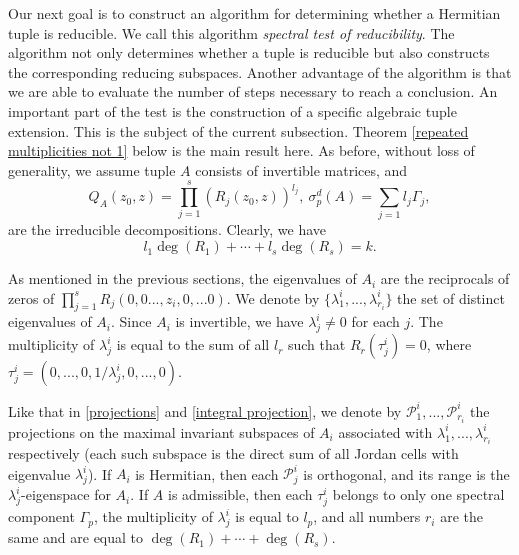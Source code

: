\documentclass[draft, 12pt, reqno]{amsart}
\numberwithin{equation}{section}
\theoremstyle{plain}
\begin{document}
Our next goal is to construct an algorithm  for determining  whether a Hermitian tuple is reducible. We call this algorithm \textit{spectral test of reducibility}. The algorithm not only determines whether a tuple is reducible but also constructs the corresponding reducing subspaces.  Another advantage of the algorithm is that we are able to evaluate the number of steps necessary to reach a conclusion. An important part of the test is the construction of a specific algebraic tuple extension. This is the subject of the current subsection. Theorem \ref{repeated multiplicities not 1} below is the main result here.
As before, without loss of generality, we assume tuple $A$ consists of invertible matrices, and
\begin{equation}\label{spectrum2}
Q_A(z_0,z)=\displaystyle \prod_{j=1}^s (R_j(z_0,z))^{l_j}, \ \sigma_p^d(A)=\sum_{j=1}l_j\Gamma_j, 
\end{equation}
are the irreducible decompositions. Clearly, we have
 \begin{equation}\label{components 0}
l_1  \deg(R_1)+\cdots +l_s  \deg(R_s)= k.
\end{equation}

As mentioned in the previous sections, the eigenvalues of $A_i$ are the reciprocals of zeros of $\prod_{j=1}^s R_j(0,0...,z_i,0,...0)$. We denote by $\{\lambda_1^i,...,\lambda_{r_i}^i\}$ the set of distinct eigenvalues of $A_i$. Since $A_i$ is invertible, we have $\lambda_j^i\neq 0$ for each $j$. The multiplicity of $\lambda_j^i$ is equal to the sum of all $l_r$ such that $R_r(\tau_j^i)=0$, where $\tau_j^i=(0,...,0,1/\lambda_j^i,0,...,0)$. 

Like that in \eqref{projections} and \eqref{integral projection}, we denote by $\mathcal{P}_1^i,...,\mathcal{P}_{r_i}^i$ the  projections on the maximal invariant subspaces of $A_i$ associated with  $\lambda_1^i,...,\lambda_{r_i}^i$ respectively (each such subspace is the direct sum of all Jordan cells with eigenvalue $\lambda_j^i$). If $A_i$ is Hermitian, then each $\mathcal{P}_j^i$ is orthogonal, and its range is the $\lambda_j^i$-eigenspace for $A_i$.
If  $A$ is admissible, then each $\tau_j^i$ belongs to only one spectral component 
$\Gamma_p$,  the multiplicity of $\lambda_j^i$ is equal to $l_p$, and all numbers $r_i$ are the same and are equal to $\deg(R_1)+\cdots +\deg(R_s)$. 
\end{document}
